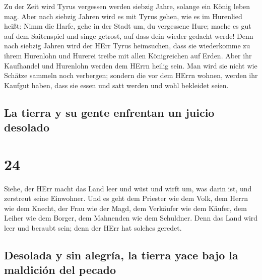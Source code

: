  Zu der Zeit wird Tyrus vergessen werden siebzig Jahre,
solange ein König leben mag. Aber nach siebzig Jahren wird es mit Tyrus
gehen, wie es im Hurenlied heißt:  Nimm die Harfe, gehe
in der Stadt um, du vergessene Hure; mache es gut auf dem Saitenspiel
und singe getrost, auf dass dein wieder gedacht werde! 
Denn nach siebzig Jahren wird der HErr Tyrus heimsuchen, dass sie
wiederkomme zu ihrem Hurenlohn und Hurerei treibe mit allen Königreichen
auf Erden.  Aber ihr Kaufhandel und Hurenlohn werden dem
HErrn heilig sein. Man wird sie nicht wie Schätze sammeln noch
verbergen; sondern die vor dem HErrn wohnen, werden ihr Kaufgut haben,
dass sie essen und satt werden und wohl bekleidet seien.

\hypertarget{la-tierra-y-su-gente-enfrentan-un-juicio-desolado}{%
\subsection{La tierra y su gente enfrentan un juicio
desolado}\label{la-tierra-y-su-gente-enfrentan-un-juicio-desolado}}

\hypertarget{section-23}{%
\section{24}\label{section-23}}

 Siehe, der HErr macht das Land leer und wüst und wirft
um, was darin ist, und zerstreut seine Einwohner.  Und es
geht dem Priester wie dem Volk, dem Herrn wie dem Knecht, der Frau wie
der Magd, dem Verkäufer wie dem Käufer, dem Leiher wie dem Borger, dem
Mahnenden wie dem Schuldner.  Denn das Land wird leer und
beraubt sein; denn der HErr hat solches geredet.

\hypertarget{desolada-y-sin-alegruxeda-la-tierra-yace-bajo-la-maldiciuxf3n-del-pecado}{%
\subsection{Desolada y sin alegría, la tierra yace bajo la maldición del
pecado}\label{desolada-y-sin-alegruxeda-la-tierra-yace-bajo-la-maldiciuxf3n-del-pecado}}

